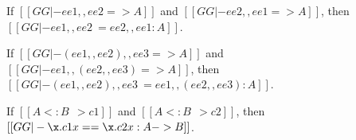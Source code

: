 \begin{corollary}[Commutativity] \label{lemma:commu}
  If $[[GG |- ee1 ,, ee2 => A ]]$ and $[[GG |- ee2 ,, ee1 => A ]]$, then
  $[[GG |- ee1 ,, ee2 ~= ee2 ,, ee1 : A]]$.
\end{corollary}


\begin{corollary}[Associativity] \label{lemma:assoc}
  If $[[GG |- (ee1 ,, ee2) ,, ee3 => A  ]]$ and $[[GG |- ee1 ,, (ee2 ,, ee3) => A ]]$, then
  $[[GG |- (ee1 ,, ee2) ,, ee3 ~= ee1 ,, (ee2 ,, ee3) : A]]$.
\end{corollary}

\begin{corollary}
  \label{lemma:coercion_same}
  If $[[A <: B ~~> c1]]$ and $[[A <: B ~~> c2]]$, then $[[GG |- \x . c1 x == \x . c2 x :  A  ->  B ]]$.
\end{corollary}



